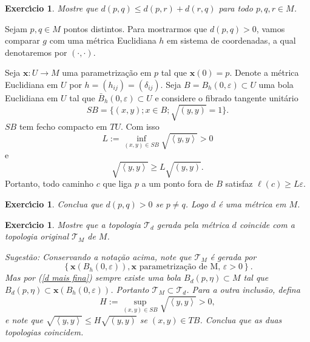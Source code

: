 \documentclass{article}[11pt]
\newtheorem{exercicio}[theorem]{Exerc\'\i cio}
\begin{document}
\begin{exercicio}
Mostre que $d(p,q) \leq d(p,r) + d(r,q)$ para todo $p,q,r \in M$.
\end{exercicio}

Sejam $p,q\in M$ pontos distintos. 
Para mostrarmos que $d(p,q)>0$, vamos comparar $g$ com uma métrica Euclidiana $h$ em sistema de coordenadas, a qual denotaremos por $(\cdot,\cdot)$.

Seja $\mathbf x: U \rightarrow M$ uma parametrização em $p$ tal que $\mathbf x(0)=p$.
Denote a métrica Euclidiana em $U$ por $h=(h_{ij})=(\delta_{ij})$.
Seja $B = B_h(0,\varepsilon) \subset U$ uma bola Euclidiana em $U$ tal que $\bar B_h(0,\varepsilon) \subset U$ e considere o fibrado tangente unitário 
\[
SB = \{(x,y);x \in B;\sqrt{( y,y)} = 1 \}.
\]
$SB$ tem fecho compacto em $TU$. Com isso
\[
L := \inf_{(x,y) \in SB} \sqrt{\left< y,y\right>} > 0
\]
e
\begin{equation}
\label{d mais fina}
\sqrt{\left< y,y\right>} \geq L \sqrt{\left(y,y \right)}.
\end{equation}
Portanto, todo caminho $c$ que liga $p$ a um ponto fora de $B$ satisfaz $\ell(c) \geq L\varepsilon$.

\begin{exercicio}
Conclua que $d(p,q)>0$ se $p\neq q$. 
Logo $d$ é uma métrica em $M$.
\end{exercicio}

\begin{exercicio}
Mostre que a topologia $\mathcal T_d$ gerada pela métrica $d$ coincide com a topologia original $\mathcal T_M$ de $M$.

Sugestão: Conservando a notação acima, note que $\mathcal T_M$ é gerada por 
\[
\left\{ \mathbf x(B_h(0,\varepsilon)), \mathbf x \text{ parametriza\c c\~ao de M, }\varepsilon > 0 \right\}.
\] 
Mas por (\ref{d mais fina}) sempre existe uma bola $B_d(p,\eta) \subset M$ tal que $B_d(p,\eta) \subset \mathbf x(B_h(0,\varepsilon))$.
Portanto $\mathcal T_M \subset \mathcal T_d$.
Para a outra inclusão, defina
\[
H := \sup_{(x,y) \in SB} \sqrt{\left< y,y\right>} > 0,
\]
e note que $\sqrt{\left< y,y\right>} \leq H \sqrt{( y,y)}$ se $(x,y) \in TB$. 
Conclua que as duas topologias coincidem.

\end{exercicio}
\end{document}

